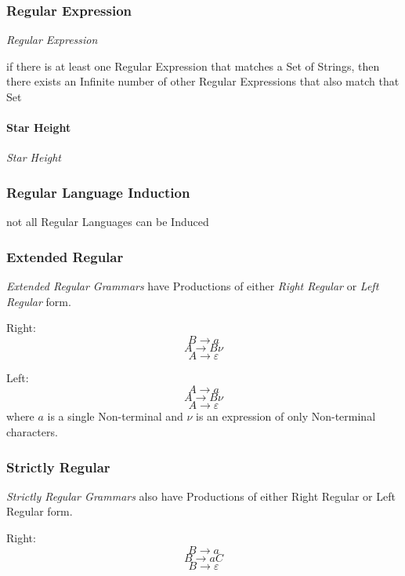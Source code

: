\subsubsection{Regular Expression}\label{sec:regular_expression}

\emph{Regular Expression}

if there is at least one Regular Expression that matches a Set of
Strings, then there exists an Infinite number of other Regular
Expressions that also match that Set



\paragraph{Star Height}\label{sec:star_height}\hfill

\emph{Star Height}



\subsubsection{Regular Language Induction}
\label{sec:regular_language_induction}

not all Regular Languages can be Induced



\subsubsection{Extended Regular}\label{sec:extended_regular}

\emph{Extended Regular Grammars} have Productions of either \emph{Right
Regular} or \emph{Left Regular} form.

Right:
\[
  B \rightarrow a
\]\[
  A \rightarrow B \nu
\]\[
  A \rightarrow \varepsilon
\]

Left:
\[
  A \rightarrow a
\]\[
  A \rightarrow B \nu
\]\[
  A \rightarrow \varepsilon
\]
where $a$ is a single Non-terminal and $\nu$ is an expression of only
Non-terminal characters.



\subsubsection{Strictly Regular}\label{sec:strictly_regular}

\emph{Strictly Regular Grammars} also have Productions of either Right
Regular or Left Regular form.

Right:
\[
  B \rightarrow a
\]\[
  B \rightarrow aC
\]\[
  B \rightarrow \varepsilon
\]

